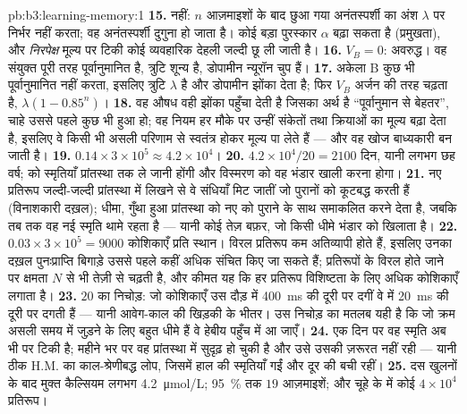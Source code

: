 \begin{solution}{pb:b3:learning-memory:1}
\textbf{15.} नहीं: $n$ आज़माइशों के बाद छुआ गया अनंतस्पर्शी का अंश
$\lambda$ पर निर्भर नहीं करता; वह अनंतस्पर्शी दुगुना हो जाता है। कोई
बड़ा पुरस्कार $\alpha$ बढ़ा सकता है (प्रमुखता), और
\emph{निरपेक्ष} मूल्य पर टिकी कोई व्यवहारिक देहली जल्दी छू ली जाती है।
\textbf{16.} $V_{B} = 0$: अवरुद्ध। वह संयुक्त पूरी तरह पूर्वानुमानित है,
त्रुटि शून्य है, डोपामीन न्यूरॉन चुप हैं।
\textbf{17.} अकेला B कुछ भी पूर्वानुमानित नहीं करता, इसलिए त्रुटि
$\lambda$ है और डोपामीन झोंका देता है; फिर $V_{B}$ अर्जन की तरह चढ़ता
है, $\lambda(1 -
0.85^{n})$।
\textbf{18.} वह औषध वही झोंका पहुँचा देती है जिसका अर्थ है
``पूर्वानुमान से बेहतर'', चाहे उससे पहले कुछ भी हुआ हो; वह नियम हर मौके
पर उन्हीं संकेतों तथा क्रियाओं का मूल्य बढ़ा देता है, इसलिए वे किसी भी
असली परिणाम से स्वतंत्र होकर मूल्य पा लेते हैं --- और वह खोज बाध्यकारी
बन जाती है।
\textbf{19.} $0.14\times 3\times 10^{5} \approx 4.2\times 10^{4}$।
\textbf{20.} $4.2\times 10^{4}/20 = 2100$ दिन, यानी लगभग छह वर्ष;
 को स्मृतियाँ प्रांतस्था तक ले जानी होंगी और विस्मरण को वह
भंडार खाली करना होगा।
\textbf{21.} नए प्रतिरूप जल्दी-जल्दी प्रांतस्था में लिखने से वे संधियाँ
मिट जातीं जो पुरानों को कूटबद्ध करती हैं (विनाशकारी दख़ल); धीमा,
गुँथा हुआ  प्रांतस्था को नए को पुराने के साथ समाकलित करने देता
है, जबकि तब तक वह नई स्मृति  थामे रहता है --- यानी कोई तेज़
बफ़र, जो किसी धीमे भंडार को खिलाता है।
\textbf{22.} $0.03\times 3\times 10^{5} = 9000$ कोशिकाएँ प्रति स्थान।
विरल प्रतिरूप कम अतिव्यापी होते हैं, इसलिए उनका दख़ल पुनःप्राप्ति
बिगाड़े उससे पहले कहीं अधिक संचित किए जा सकते हैं; प्रतिरूपों के विरल
होते जाने पर क्षमता $N$ से भी तेज़ी से चढ़ती है, और कीमत यह कि हर
प्रतिरूप विशिष्टता के लिए अधिक कोशिकाएँ लगाता है।
\textbf{23.} $20$ का निचोड़: जो कोशिकाएँ उस दौड़ में \qty{400}{ms} की
दूरी पर दगीं वे  में \qty{20}{ms} की दूरी पर दगती हैं --- यानी
आवेग-काल की खिड़की के भीतर। उस निचोड़ का मतलब यही है कि जो क्रम असली
समय में जुड़ने के लिए बहुत धीमे हैं वे हेबीय पहुँच में आ जाएँ।
\textbf{24.} एक दिन पर वह स्मृति अब भी  पर टिकी है; महीने
भर पर वह प्रांतस्था में सुदृढ़ हो चुकी है और उसे उसकी ज़रूरत नहीं रही
--- यानी ठीक H.M. का काल-श्रेणीबद्ध लोप, जिसमें हाल की स्मृतियाँ गईं और
दूर की बची रहीं।
\textbf{25.} दस खुलनों के बाद मुक्त कैल्सियम लगभग
\qty{4.2}{\micro mol/L}; \qty{95}{\%} तक $19$ आज़माइशें; और चूहे के
 में कोई $4\times 10^{4}$ प्रतिरूप।
\end{solution}
